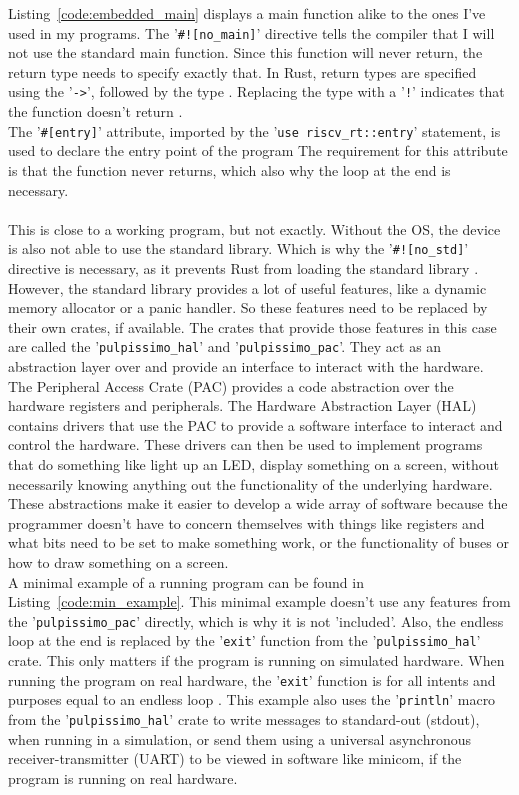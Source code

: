 Listing~\ref{code:embedded_main} displays a main function alike to the ones I've used in my programs.
The '\lstinline{#![no_main]}' directive tells the compiler that I will not use the standard main function.
Since this function will never return, the return type needs to specify exactly that.
In Rust, return types are specified using the '\lstinline{->}', followed by the type \cite{rust_return}.
Replacing the type with a '\lstinline{!}' indicates that the function doesn't return \cite{rust_never_type}.
\\
The '\lstinline{#[entry]}' attribute, imported by the '\lstinline{use riscv_rt::entry}' statement, is used to declare the entry point of the program \cite{riscv_rt_entry}
The requirement for this attribute is that the function never returns, which also why the loop at the end is necessary.
\\\\
This is close to a working program, but not exactly.
Without the OS, the device is also not able to use the standard library.
Which is why the '\lstinline{#![no_std]}' directive is necessary, as it prevents Rust from loading the standard library \cite{rust_no_std}.
However, the standard library provides a lot of useful features, like a dynamic memory allocator or a panic handler.
So these features need to be replaced by their own crates, if available.
The crates that provide those features in this case are called the '\lstinline{pulpissimo_hal}' and '\lstinline{pulpissimo_pac}'.
They act as an abstraction layer over and provide an interface to interact with the hardware.
The Peripheral Access Crate (PAC) provides a code abstraction over the hardware registers and peripherals.
The Hardware Abstraction Layer (HAL) contains drivers that use the PAC to provide a software interface
to interact and control the hardware.
These drivers can then be used to implement programs that do something like light up an LED, display something on a screen,
without necessarily knowing anything out the functionality of the underlying hardware.
These abstractions make it easier to develop a wide array of software because the programmer doesn't have to concern themselves
with things like registers and what bits need to be set to make something work, or the functionality of buses or how to draw
something on a screen.
\\
A minimal example of a running program can be found in Listing~\ref{code:min_example}.
This minimal example doesn't use any features from the '\lstinline{pulpissimo_pac}' directly, which is why it is not 'included'.
Also, the endless loop at the end is replaced by the '\lstinline{exit}' function from the '\lstinline{pulpissimo_hal}' crate.
This only matters if the program is running on simulated hardware. When running the program on real hardware, the '\lstinline{exit}' function is
for all intents and purposes equal to an endless loop \cite[Ch 4.3.10]{rust_pulp}.
This example also uses the '\lstinline{println}' macro from the '\lstinline{pulpissimo_hal}' crate to write messages
to standard-out (stdout), when running in a simulation, or send them using a universal asynchronous receiver-transmitter (UART)
to be viewed in software like minicom, if the program is running on real hardware.

